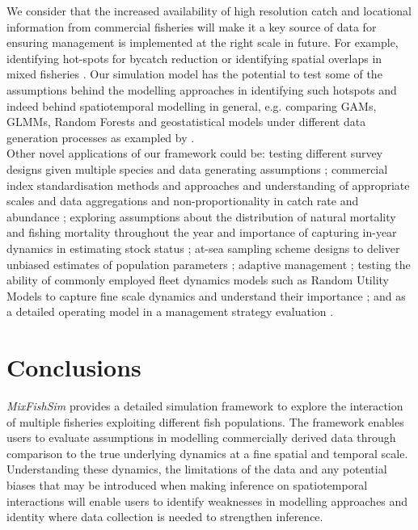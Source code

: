\documentclass[preprint]{elsarticle}
\begin{document}
We consider that the increased availability of high resolution catch and
locational information from commercial fisheries will make it a key source of
data for ensuring management is implemented at the right scale in future. For
example, identifying hot-spots for bycatch reduction or identifying spatial
overlaps in mixed fisheries \citep{Dolder2018, Gardner2008, Little2014,
	Dedman2015, Ward2015}. Our simulation model has the potential to test
some of the assumptions behind the modelling approaches in identifying such
hotspots and indeed behind spatiotemporal modelling in general, e.g. comparing
GAMs, GLMMs, Random Forests and geostatistical models under different data
generation processes as exampled by \cite{Stock2019}. \\

Other novel applications of our framework could be: testing different survey
designs given multiple species and data generating assumptions \citep{Xu2015};
commercial index standardisation methods and approaches and understanding of
appropriate scales and data aggregations and non-proportionality in catch rate
and abundance \citep{Harley2001, Maunder2004}; exploring assumptions about the
distribution of natural mortality and fishing mortality throughout the year and
importance of capturing in-year dynamics in estimating stock status
\citep{Liu2013}; at-sea sampling scheme designs to deliver unbiased estimates
of population parameters \citep{Cotter2007, Kimura2006}; adaptive management
\citep{Walters2007, Dunn2016}; testing the ability of commonly employed fleet
dynamics models such as Random Utility Models to capture fine scale dynamics
and understand their importance \citep{Girardin2016}; and as a detailed
operating model in a management strategy evaluation \citep{Mahevas2004}. \\

\section{Conclusions}

\textit{MixFishSim} provides a detailed simulation framework to explore the
interaction of multiple fisheries exploiting different fish populations. The
framework enables users to evaluate assumptions in modelling commercially
derived data through comparison to the true underlying dynamics at a fine
spatial and temporal scale. Understanding these dynamics, the limitations of
the data and any potential biases that may be introduced when making inference
on spatiotemporal interactions will enable users to identify weaknesses in
modelling approaches and identity where data collection is needed to strengthen
inference. \\
\end{document}
